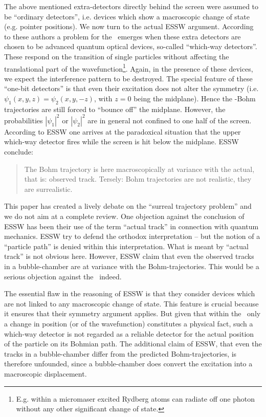 The above mentioned extra-detectors directly behind the screen were
assumed to be ``ordinary detectors'', i.e. devices which show a
macroscopic change of state (e.g. pointer positions). We now turn to
the actual ESSW argument.  According to these authors a problem for
the \dbb\ emerges when these extra detectors are chosen to be advanced
quantum optical devices, so-called ``which-way detectors''. These
respond on the transition of single particles without affecting the
translational part of the wavefunction\footnote{E.g. within a
micromaser excited Rydberg atoms can radiate off one photon without
any other significant change of state.}. Again, in the presence of
these devices, we expect the interference pattern to be destroyed. The
special feature of these ``one-bit detectors'' is that even their
excitation does not alter the symmetry (i.e.
$\psi_1(x,y,z)=\psi_2(x,y,-z)$, with $z=0$ being the midplane). Hence
the \db-Bohm trajectories are still forced to ``bounce off'' the
midplane. However, the probabilities $|\psi_1|^2$ or $|\psi_2|^2$ are
in general not confined to one half of the screen.
According to ESSW one arrives at the paradoxical situation that 
the upper which-way detector fires while  the screen is hit below the midplane. 
ESSW conclude:
\begin{quote}
The Bohm trajectory is here macroscopically at variance with the actual, that
is: observed track. Tersely: Bohm trajectories are not realistic, they are
surrealistic.
\end{quote} 
This paper has created a lively debate on the ``surreal trajectory problem'' \cite{barrett,dhs,dfgz,hcm,motc,scully}
and we do not aim at a complete review. 
One objection against the conclusion of ESSW has been their use of the term 
``actual track'' in connection with quantum mechanics.
ESSW try to defend the orthodox interpretation -- but the notion of a ``particle path'' 
is denied within this interpretation. What is meant by ``actual track'' 
is not obvious here. However, ESSW claim that even the observed tracks in a 
bubble-chamber are at variance with the Bohm-trajectories. This would be a serious 
objection against the \dbb\ indeed.

The essential flaw in the reasoning of ESSW is that they consider devices
which are not linked to any macroscopic change of state. This feature is 
crucial because it ensures that their symmetry argument applies.
But given that within the \dbb\ only a change in position (or of the wavefunction)
constitutes a physical fact, such a which-way detector is not regarded as a reliable 
detector for the actual position of the particle on its Bohmian path. 
The additional claim of ESSW, that even the tracks in a 
bubble-chamber differ from  the predicted Bohm-trajectories, is therefore unfounded, since a bubble-chamber does 
convert the excitation into a macroscopic displacement.  

